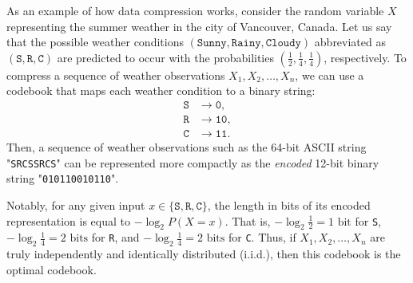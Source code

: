 As an example of how data compression works, consider the random variable $X$ representing the summer weather in the city of Vancouver, Canada.
Let us say that the %
possible weather conditions
$(\texttt{Sunny}, \texttt{Rainy}, \texttt{Cloudy})$ abbreviated as
$(\texttt{S}, \texttt{R}, \texttt{C})$ are predicted to occur with the probabilities
$(\frac{1}{2}, \frac{1}{4}, \frac{1}{4})$, respectively.
To compress a sequence of weather observations $X_1, X_2, \ldots, X_n$, we can use a codebook that maps each weather condition to a binary string:
\begin{align*}
  \texttt{S} &\rightarrow \texttt{0}, \\
  \texttt{R} &\rightarrow \texttt{10}, \\
  \texttt{C} &\rightarrow \texttt{11}.
\end{align*}
Then, a sequence of weather observations such as the 64-bit ASCII string "\texttt{SRCSSRCS}" can be represented more compactly as the \emph{encoded} 12-bit binary string "\texttt{010110010110}".

Notably, for any given input $x \in \{\texttt{S}, \texttt{R}, \texttt{C}\}$, the length in bits of its encoded representation is equal to $-\log_2 P(X = x)$.
That is,
$-\log_2 \frac{1}{2} = 1 \text{ bit}$ for \texttt{S},
$-\log_2 \frac{1}{4} = 2 \text{ bits}$ for \texttt{R},
and $-\log_2 \frac{1}{4} = 2 \text{ bits}$ for \texttt{C}.
Thus, if $X_1, X_2, \ldots, X_n$ are truly independently and identically distributed (i.i.d.), then this codebook is the optimal codebook.

